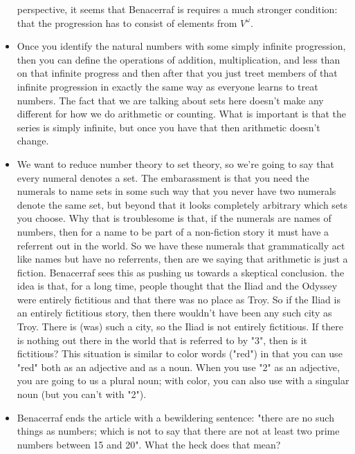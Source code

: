 \documentclass[12pt]{article}
\theoremstyle{definition}
\begin{document}
\begin{itemize}
        perspective, it seems that Benacerraf is requires a much stronger
        condition: that the progression has to consist of elements from
        $V^\omega$. 
    \item
        Once you identify the natural numbers with some simply infinite
        progression, then you can define the operations of addition,
        multiplication, and less than on that infinite progress and then after
        that you just treet members of that infinite progression in exactly the
        same way as everyone learns to treat numbers. The fact that we are
        talking about sets here doesn't make any different for how we do
        arithmetic or counting. What is important is that the series is simply
        infinite, but once you have that then arithmetic doesn't change.
    \item
        We want to reduce number theory to set theory, so we're going to say
        that every numeral denotes a set. The embarassment is that you need the
        numerals to name sets in some such way that you never have two numerals
        denote the same set, but beyond that it looks completely arbitrary
        which sets you choose. Why that is troublesome is that, if the numerals
        are names of numbers, then for a name to be part of a non-fiction story
        it must have a referrent out in the world. So we have these numerals
        that grammatically act like names but have no referrents, then are we
        saying that arithmetic is just a fiction. Benacerraf sees this as
        pushing us towards a skeptical conclusion. the idea is that, for a long
        time, people thought that the Iliad and the Odyssey were entirely
        fictitious and that there was no place as Troy. So if the Iliad is an
        entirely fictitious story, then there wouldn't have been any such city
        as Troy. There is (was) such a city, so the Iliad is not entirely
        fictitious. If there is nothing out there in the world that is referred
        to by "3", then is it fictitious? This situation is similar to color
        words ("red") in that you can use "red" both as an adjective and as a
        noun. When you use "2" as an adjective, you are going to us a plural
        noun; with color, you can also use with a singular noun (but you can't
        with "2").
    \item
        Benacerraf ends the article with a bewildering sentence: "there are no
        such things as numbers; which is not to say that there are not at least
        two prime numbers between 15 and 20". What the heck does that mean?

\end{itemize}
\end{document}
